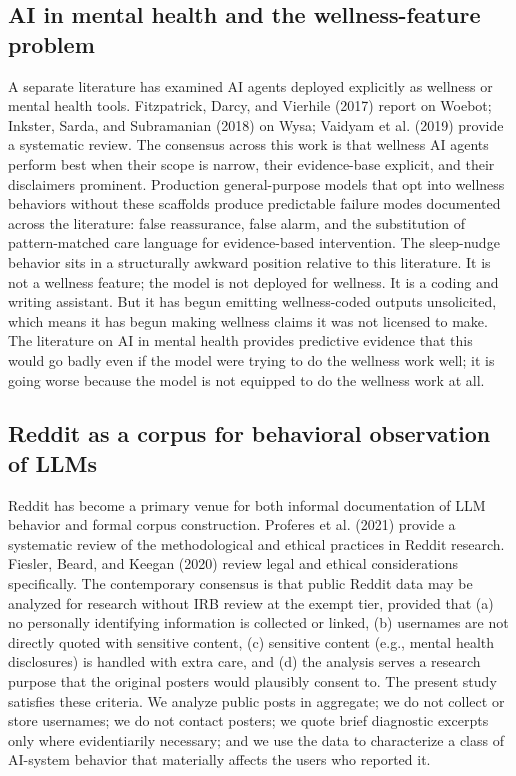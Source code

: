 \documentclass{obelus-preprint}
\begin{document}
\subsection{AI in mental health and the wellness-feature problem}
A separate literature has examined AI agents deployed explicitly as wellness or mental health tools. Fitzpatrick, Darcy, and Vierhile (2017) report on Woebot; Inkster, Sarda, and Subramanian (2018) on Wysa; Vaidyam et al. (2019) provide a systematic review. The consensus across this work is that wellness AI agents perform best when their scope is narrow, their evidence-base explicit, and their disclaimers prominent. Production general-purpose models that opt into wellness behaviors without these scaffolds produce predictable failure modes documented across the literature: false reassurance, false alarm, and the substitution of pattern-matched care language for evidence-based intervention.
The sleep-nudge behavior sits in a structurally awkward position relative to this literature. It is not a wellness feature; the model is not deployed for wellness. It is a coding and writing assistant. But it has begun emitting wellness-coded outputs unsolicited, which means it has begun making wellness claims it was not licensed to make. The literature on AI in mental health provides predictive evidence that this would go badly even if the model were trying to do the wellness work well; it is going worse because the model is not equipped to do the wellness work at all.
\subsection{Reddit as a corpus for behavioral observation of LLMs}
Reddit has become a primary venue for both informal documentation of LLM behavior and formal corpus construction. Proferes et al. (2021) provide a systematic review of the methodological and ethical practices in Reddit research. Fiesler, Beard, and Keegan (2020) review legal and ethical considerations specifically. The contemporary consensus is that public Reddit data may be analyzed for research without IRB review at the exempt tier, provided that (a) no personally identifying information is collected or linked, (b) usernames are not directly quoted with sensitive content, (c) sensitive content (e.g., mental health disclosures) is handled with extra care, and (d) the analysis serves a research purpose that the original posters would plausibly consent to.
The present study satisfies these criteria. We analyze public posts in aggregate; we do not collect or store usernames; we do not contact posters; we quote brief diagnostic excerpts only where evidentiarily necessary; and we use the data to characterize a class of AI-system behavior that materially affects the users who reported it.
\end{document}
